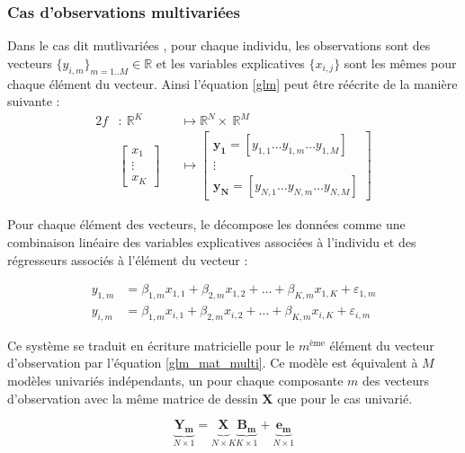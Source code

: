 \subsubsection*{Cas d'observations multivariées}
Dans le cas dit \og mutlivariées \fg, pour chaque individu, les observations sont des vecteurs $\{y_{i,m}\}_{m=1..M} \in \mathbb{R}$ 
et les variables explicatives $\{x_{i,j}\}$ sont les mêmes pour chaque élément du vecteur.
Ainsi l'équation \eqref{glm} peut être réécrite de la manière suivante :
\begin{alignat}{2}
    f &:\ \mathbb{R}^{K} &&\mapsto \mathbb{R}^{N}\times\ \mathbb{R}^{M} \nonumber \\
    &{}\left[\begin{array}{c}
x_1\\
\vdots\\
x_K
\end{array}\right] &&\mapsto \left[\begin{array}{c}
\mathbf{y_1} = \left[y_{1,1} \dots y_{1,m} \dots y_{1,M} \right]\\
\vdots\\
\mathbf{y_N} = \left[y_{N,1} \dots y_{N,m} \dots y_{N,M} \right]
\end{array}\right]
\label{glm_multi}
\end{alignat}

Pour chaque élément des vecteurs, le \mlg décompose les données comme une combinaison linéaire des variables explicatives associées à l'individu
et des régresseurs associés à l'élément du vecteur :

\begin{align}
    y_{1,m} &= \beta_{1,m}x_{1,1} + \beta_{2,m}x_{1,2} + \dots + \beta_{K,m}x_{1,K} + \varepsilon_{1,m} \nonumber\\
    y_{i,m} &= \beta_{1,m}x_{i,1} + \beta_{2,m}x_{i,2} + \dots + \beta_{K,m}x_{i,K} + \varepsilon_{i,m} 
\end{align}

Ce système se traduit en écriture matricielle pour le $m^\text{ème}$ élément du vecteur d'observation par l'équation \eqref{glm_mat_multi}. 
Ce modèle est équivalent à $M$ modèles univariés indépendants, un pour chaque composante $m$ des vecteurs d'observation 
avec la même matrice de dessin $\mathbf{X}$ que pour le cas univarié.

\begin{equation}
     \underbrace{\mathbf{Y_m}}_{N\times 1} = 
	      \underbrace{\mathbf{X_{}}}_{N\times K}\underbrace{\mathbf{B_m}}_{K\times 1} + \underbrace{\mathbf{e_m}}_{N\times 1}
    \label{glm_mat_multi}
\end{equation}

